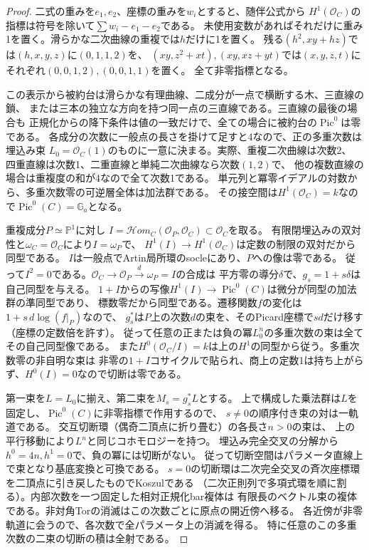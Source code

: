 \begin{proof}
二式の重みを$e_1,e_2$、座標の重みを$w_i$とすると、随伴公式から
$H^1(\mathcal O_C)$の指標は符号を除いて$\sum w_i-e_1-e_2$である。
未使用変数があればそれだけに重み1を置く。滑らかな二次曲線の重複では$h$だけに1を置く。
残る$(h^2,xy+hz)$では$(h,x,y,z)$に$(0,1,1,2)$を、
$(xy,z^2+xt),(xy,xz+yt)$では$(x,y,z,t)$にそれぞれ$(0,0,1,2),(0,0,1,1)$を置く。
全て非零指標となる。

この表示から被約台は滑らかな有理曲線、二成分が一点で横断する木、三直線の鎖、
または三本の独立な方向を持つ同一点の三直線である。三直線の最後の場合も
正規化からの降下条件は値の一致だけで、全ての場合に被約台の$\operatorname{Pic}^0$は零である。
各成分の次数に一般点の長さを掛けて足すと4なので、正の多重次数は埋込み束
$L_0=\mathcal O_C(1)$のものに一意に決まる。実際、重複二次曲線は次数2、
四重直線は次数1、二重直線と単純二次曲線なら次数$(1,2)$で、
他の複数直線の場合は重複度の和が4なので全て次数1である。
単元列と冪零イデアルの対数から、多重次数零の可逆層全体は加法群である。
その接空間は$H^1(\mathcal O_C)=k$なので$\operatorname{Pic}^0(C)=\mathbb G_a$となる。

重複成分$P\simeq\mathbb P^1$に対し
$I=\mathcal Hom_C(\mathcal O_P,\mathcal O_C)\subset\mathcal O_C$を取る。
有限閉埋込みの双対性と$\omega_C=\mathcal O_C$により$I=\omega_P$で、
$H^1(I)\to H^1(\mathcal O_C)$は定数の制限の双対だから同型である。
$I$は一般点でArtin局所環のsocleにあり、$P$への像は零である。
従って$I^2=0$である。$\mathcal O_C\to\mathcal O_P\xrightarrow{d}\omega_P=I$の合成は
平方零の導分$\delta$で、$g_s=1+s\delta$は自己同型を与える。
$1+I$からの写像$H^1(I)\to\operatorname{Pic}^0(C)$は微分が同型の加法群の準同型であり、
標数零だから同型である。遷移関数$f$の変化は$1+s\,d\log(f|_P)$なので、
$g_s^*$は$P$上の次数$d$の束を、そのPicard座標で$sd$だけ移す（座標の定数倍を許す）。
従って任意の正または負の冪$L_0^n$の多重次数の束は全てその自己同型像である。
また$H^0(\mathcal O_C/I)=k$は上の$H^1$の同型から従う。多重次数零の非自明な束は
非零の$1+I$コサイクルで貼られ、商上の定数1は持ち上がらず、$H^0(I)=0$なので切断は零である。

第一束を$L=L_0$に揃え、第二束を$M_s=g_s^*L$とする。
上で構成した乗法群は$L$を固定し、$\operatorname{Pic}^0(C)$に非零指標で作用するので、
$s\ne0$の順序付き束の対は一軌道である。
交互切断環（偶奇二頂点に折り畳む）の各長さ$n>0$の束は、
上の平行移動により$L^n$と同じコホモロジーを持つ。
埋込み完全交叉の分解から$h^0=4n,h^1=0$で、負の冪には切断がない。
従って切断空間はパラメータ直線上で束となり基底変換と可換である。
$s=0$の切断環は二次完全交叉の斉次座標環を二頂点に引き戻したものでKoszulである
（二次正則列で多項式環を順に割る）。内部次数を一つ固定した相対正規化bar複体は
有限長のベクトル束の複体である。非対角Torの消滅はこの次数ごとに原点の開近傍へ移る。
各近傍が非零軌道に会うので、各次数で全パラメータ上の消滅を得る。
特に任意のこの多重次数の二束の切断の積は全射である。


\end{proof}

